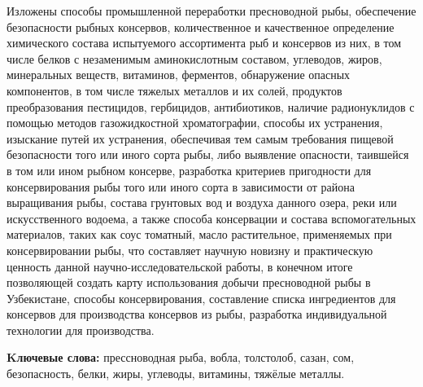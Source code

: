 Изложены способы промышленной переработки пресноводной рыбы, обеспечение
безопасности рыбных консервов, количественное и качественное определение
химического состава испытуемого ассортимента рыб и консервов из них, в
том числе белков с незаменимым аминокислотным составом, углеводов,
жиров, минеральных веществ, витаминов, ферментов, обнаружение опасных
компонентов, в том числе тяжелых металлов и их солей, продуктов
преобразования пестицидов, гербицидов, антибиотиков, наличие
радионуклидов с помощью методов газожидкостной хроматографии, способы их
устранения, изыскание путей их устранения, обеспечивая тем самым
требования пищевой безопасности того или иного сорта рыбы, либо
выявление опасности, таившейся в том или ином рыбном консерве,
разработка критериев пригодности для консервирования рыбы того или иного
сорта в зависимости от района выращивания рыбы, состава грунтовых вод и
воздуха данного озера, реки или искусственного водоема, а также способа
консервации и состава вспомогательных материалов, таких как соус
томатный, масло растительное, применяемых при консервировании рыбы, что
составляет научную новизну и практическую ценность данной
научно-исследовательской работы, в конечном итоге позволяющей создать
карту использования добычи пресноводной рыбы в Узбекистане, способы
консервирования, составление списка ингредиентов для консервов для
производства консервов из рыбы, разработка индивидуальной технологии для
производства.

{\bfseries Kлючевые слова:} прессноводная рыба, вобла, толстолоб, сазан,
сом, безопасность, белки, жиры, углеводы, витамины, тяжёлые металлы.

